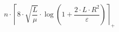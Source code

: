 \[n \cdot \left\lceil 8 \cdot \sqrt{\frac{L}{\mu}} \cdot \log\left(1 + \frac{2 \cdot L \cdot R^{2}}{\varepsilon}\right) \right\rceil_{+}\]
